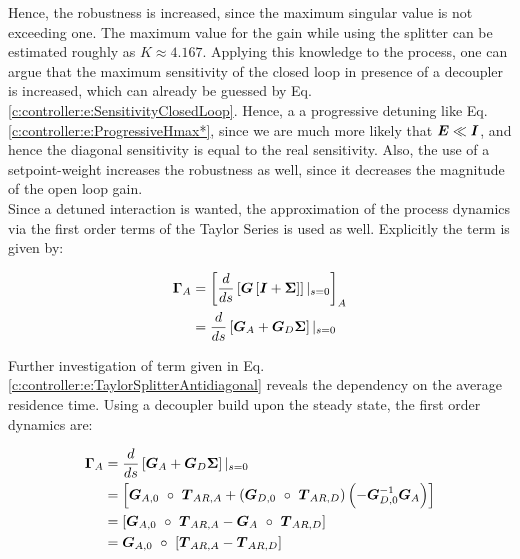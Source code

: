 Hence, the robustness is increased, since the maximum singular value is not exceeding one. The maximum value for the gain while using the splitter can be estimated roughly as $K \approx 4.167$. Applying this knowledge to the process, one can argue that the maximum sensitivity of the closed loop in presence of a decoupler is increased, which can already be guessed by Eq. \ref{c:controller:e:SensitivityClosedLoop}. Hence, a a progressive detuning like Eq.\ref{c:controller:e:ProgressiveHmax*}, since we are much more likely that $\mbox{\boldmath$E$} \ll \mbox{\boldmath$I$}$, and hence the diagonal sensitivity is equal to the real sensitivity. Also, the use of a setpoint-weight increases the robustness as well, since it decreases the magnitude of the open loop gain.\\ 

Since a detuned interaction is wanted, the approximation of the process dynamics via the first order terms of the Taylor Series is used as well. Explicitly the term is given by:

\begin{align}
\begin{split}
\mbox{\boldmath$\Gamma$}_A &= \left[\frac{d}{ds}\left[ \mbox{\boldmath$G$} \left[ \mbox{\boldmath$I$} + \mbox{\boldmath$\Sigma$} \right] \right]|_{s=0}\right]_A\\
&= \frac{d}{ds}\left[ \mbox{\boldmath$G$}_A + \mbox{\boldmath$G$}_D \mbox{\boldmath$\Sigma$} \right]|_{s=0}
\end{split}
\label{c:controller:e:TaylorSplitterAntidiagonal}
\end{align}

Further investigation of term given in Eq. \ref{c:controller:e:TaylorSplitterAntidiagonal} reveals the dependency on the average residence time. Using a decoupler build upon the steady state, the first order dynamics are:

\begin{align}
\begin{split}
\mbox{\boldmath$\Gamma$}_A &= \frac{d}{ds}\left[ \mbox{\boldmath$G$}_A + \mbox{\boldmath$G$}_D \mbox{\boldmath$\Sigma$} \right]|_{s=0} \\
&= \left[ \mbox{\boldmath$G$}_{A,0}~\circ~\mbox{\boldmath$T$}_{AR,A} + \left(\mbox{\boldmath$G$}_{D,0}~\circ~\mbox{\boldmath$T$}_{AR,D} \right) \left(-\mbox{\boldmath$G$}_{D,0}^{-1} \mbox{\boldmath$G$}_A \right)\right] \\
&= \left[ \mbox{\boldmath$G$}_{A,0}~\circ~\mbox{\boldmath$T$}_{AR,A} - \mbox{\boldmath$G$}_A~\circ~\mbox{\boldmath$T$}_{AR,D}  \right] \\
&= \mbox{\boldmath$G$}_{A,0}~\circ~\left[ \mbox{\boldmath$T$}_{AR,A} - \mbox{\boldmath$T$}_{AR,D}\right]
\end{split}
\label{c:controller:e:TaylorSplitterDynamics}
\end{align}

